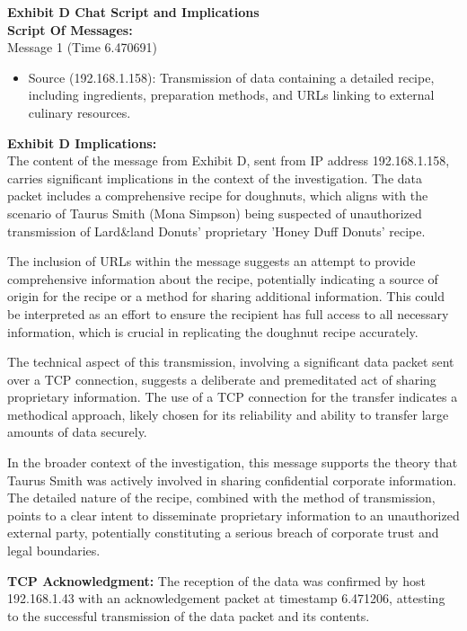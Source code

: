 \textbf{Exhibit D Chat Script and Implications}\\
\textbf{Script Of Messages:}\\
Message 1 (Time 6.470691)
\begin{itemize}
    \item Source (192.168.1.158): Transmission of data containing a detailed recipe, including ingredients, preparation methods, and URLs linking to external culinary resources.
\end{itemize}

\textbf{Exhibit D Implications:}\\
The content of the message from Exhibit D, sent from IP address 192.168.1.158, carries significant implications in the context of the investigation. The data packet includes a comprehensive recipe for doughnuts, which aligns with the scenario of Taurus Smith (Mona Simpson) being suspected of unauthorized transmission of Lard\&land Donuts' proprietary 'Honey Duff Donuts' recipe.

The inclusion of URLs within the message suggests an attempt to provide comprehensive information about the recipe, potentially indicating a source of origin for the recipe or a method for sharing additional information. This could be interpreted as an effort to ensure the recipient has full access to all necessary information, which is crucial in replicating the doughnut recipe accurately.

The technical aspect of this transmission, involving a significant data packet sent over a TCP connection, suggests a deliberate and premeditated act of sharing proprietary information. The use of a TCP connection for the transfer indicates a methodical approach, likely chosen for its reliability and ability to transfer large amounts of data securely.

In the broader context of the investigation, this message supports the theory that Taurus Smith was actively involved in sharing confidential corporate information. The detailed nature of the recipe, combined with the method of transmission, points to a clear intent to disseminate proprietary information to an unauthorized external party, potentially constituting a serious breach of corporate trust and legal boundaries.

\textbf{TCP Acknowledgment:} The reception of the data was confirmed by host 192.168.1.43 with an acknowledgement packet at timestamp 6.471206, attesting to the successful transmission of the data packet and its contents.

